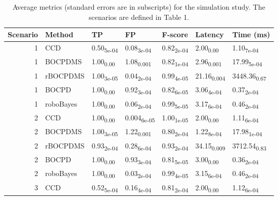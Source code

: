 \begin{table}[H]
\centering
\caption{Average metrics (standard errors are in subscripts) for the simulation
study. The scenarios are defined in Table 1.\\} 
\label{tab:sim_results}
\begin{tabular}{rllllll}
  \hline
Scenario & Method & TP & FP & F-score & Latency & Time (ms) \\ 
  \hline
  1 & CCD & 0.50\textsubscript{5e-04} & 0.08\textsubscript{3e-04} & 0.82\textsubscript{2e-04} & 2.00\textsubscript{0.00} & 1.10\textsubscript{7e-04} \\ 
    1 & BOCPDMS & 1.00\textsubscript{0.00} & 1.08\textsubscript{0.001} & 0.82\textsubscript{1e-04} & 2.96\textsubscript{0.001} & 17.99\textsubscript{5e-04} \\ 
    1 & rBOCPDMS & 1.00\textsubscript{3e-05} & 0.04\textsubscript{2e-04} & 0.99\textsubscript{4e-05} & 21.16\textsubscript{0.004} & 3448.36\textsubscript{0.67} \\ 
    1 & BOCPD & 1.00\textsubscript{0.00} & 0.92\textsubscript{3e-04} & 0.82\textsubscript{6e-05} & 3.06\textsubscript{4e-04} & 0.37\textsubscript{2e-04} \\ 
    1 & roboBayes & 1.00\textsubscript{0.00} & 0.06\textsubscript{2e-04} & 0.99\textsubscript{5e-05} & 3.17\textsubscript{6e-04} & 0.46\textsubscript{2e-04} \\ 
   \hline
  2 & CCD & 1.00\textsubscript{0.00} & 0.004\textsubscript{6e-05} & 1.00\textsubscript{1e-05} & 2.00\textsubscript{0.00} & 1.11\textsubscript{6e-04} \\ 
    2 & BOCPDMS & 1.00\textsubscript{3e-05} & 1.22\textsubscript{0.001} & 0.80\textsubscript{2e-04} & 1.22\textsubscript{8e-04} & 17.98\textsubscript{1e-04} \\ 
    2 & rBOCPDMS & 0.93\textsubscript{2e-04} & 0.28\textsubscript{6e-04} & 0.93\textsubscript{2e-04} & 34.15\textsubscript{0.009} & 3712.54\textsubscript{0.83} \\ 
    2 & BOCPD & 1.00\textsubscript{0.00} & 0.93\textsubscript{3e-04} & 0.81\textsubscript{5e-05} & 3.00\textsubscript{0.00} & 0.36\textsubscript{2e-04} \\ 
    2 & roboBayes & 1.00\textsubscript{0.00} & 0.03\textsubscript{2e-04} & 0.99\textsubscript{4e-05} & 3.15\textsubscript{6e-04} & 0.46\textsubscript{2e-04} \\ 
   \hline
  3 & CCD & 0.52\textsubscript{5e-04} & 0.16\textsubscript{4e-04} & 0.81\textsubscript{2e-04} & 2.00\textsubscript{0.00} & 1.12\textsubscript{6e-04} \\ 

\end{tabular}
\end{table}
